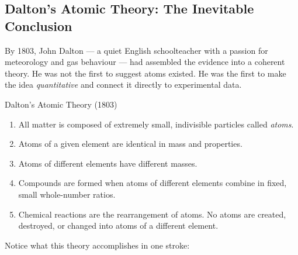 \documentclass[12pt, a4paper]{book}
\theoremstyle{definition}
\newcommand{\newterm}[1]{\textit{\textcolor{DiscoveryColor}{#1}}}
\begin{document}
\subsection{Dalton's Atomic Theory: The Inevitable Conclusion}

By 1803, John Dalton --- a quiet English schoolteacher with
a passion for meteorology and gas behaviour ---
had assembled the evidence into a coherent theory.
He was not the first to suggest atoms existed.
He was the first to make the idea \emph{quantitative}
and connect it directly to experimental data.

\begin{namedconcept}{Dalton's Atomic Theory (1803)}
\begin{enumerate}[leftmargin=2em, nosep]
  \item All matter is composed of extremely small, indivisible
        particles called \newterm{atoms}.
  \item Atoms of a given element are identical in mass
        and properties.
  \item Atoms of different elements have different masses.
  \item Compounds are formed when atoms of different elements
        combine in fixed, small whole-number ratios.
  \item Chemical reactions are the rearrangement of atoms.
        No atoms are created, destroyed, or changed into
        atoms of a different element.
\end{enumerate}
\end{namedconcept}

\vspace{0.5em}

Notice what this theory accomplishes in one stroke:
\end{document}

